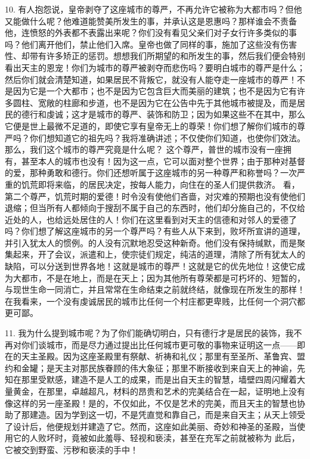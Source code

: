 10. 有人抱怨说，皇帝剥夺了这座城市的尊严，不再允许它被称为大都市吗？但他又能做什么呢？他难道能赞美所发生的事，并承认这是恩惠吗？那样谁会不责备他，连愤怒的外表都不表露出来呢？你们没有看见父亲们对子女行许多类似的事吗？他们离开他们，禁止他们入席。皇帝也做了同样的事，施加了这些没有伤害性、却带有许多矫正的惩罚。想想我们所期望的和所发生的事，然后我们便会特别看出天主的恩宠！你们为城市的尊严被剥夺而悲伤吗？要明白城市的尊严是什么；然后你们就会清楚知道，如果居民不背叛它，就没有人能夺走一座城市的尊严！不是因为它是一个大都市；也不是因为它包含巨大而美丽的建筑；也不是因为它有许多圆柱、宽敞的柱廊和步道，也不是因为它在公告中先于其他城市被提及，而是居民的德行和虔诚；这才是城市的尊严、装饰和防卫；因为如果这些不在其中，那么它便是世上最微不足道的，即使它享有皇帝无上的尊荣！你们想了解你们城市的尊严吗？你们想知道它的祖先吗？我将准确讲述；不仅使你们知道，也使你们效法。那么，我们这个城市的尊严究竟是什么呢？ 这个尊严，普世的城市没有一座拥有，甚至本人的城市也没有！因为这一点，它可以面对整个世界；由于那种对基督的爱，那种勇敢和德行。你们还想听属于这座城市的另一种尊严和称誉吗？一次严重的饥荒即将来临，的居民决定，按每人能力，向住在的圣人们提供救济。 看，第二个尊严，饥荒时期的爱德！时令没有使他们吝啬，对灾难的预期也没有使他们退缩；但当所有人都倾向于搜刮不属于自己的东西时，他们却分施自己的，不仅给近处的人，也给远处居住的人！你们在这里看到对天主的信德和对邻人的爱德了吗？你们想了解这座城市的另一个尊严吗？有些人从下来到，败坏所宣讲的道理，并引入犹太人的惯例。的人没有沉默地忍受这种新奇。他们没有保持缄默，而是聚集起来，开了会议，派遣和上，使宗徒们规定，纯洁的道理，清除了所有犹太人的缺陷，可以分送到世界各地！这就是城市的尊严！这就是它的优先地位！这使它成为大都市，不是在地上，而是在天上；因为其他所有尊荣都是可朽坏的、短暂的，与现世生命一同消亡，并且常常在生命结束之前就终结，就像现在所发生的那样！在我看来，一个没有虔诚居民的城市比任何一个村庄都更卑贱，比任何一个洞穴都更可鄙。\par

11. 我为什么提到城市呢？为了你们能确切明白，只有德行才是居民的装饰，我不再对你们谈城市，而是尽力通过提出比任何城市更可敬的事物来证明这一点——即在的天主圣殿。因为这座圣殿里有祭献、祈祷和礼仪；那里有至圣所、革鲁宾、盟约和金罐；是天主对那民族眷顾的伟大象征；那里不断接收到来自天上的神谕，先知在那里受默感，建造不是人工的成果，而是出自天主的智慧，墙壁四周闪耀着大量黄金，在那里，卓越超凡，材料的昂贵和艺术的完美结合在一起，证明地上没有像这样的另一座圣殿！是的，不仅如此，不仅是艺术的完美，而且天主的智慧也协助了那建造。因为学到这一切，不是凭直觉和靠自己，而是来自天主；从天上领受了设计后，他便规划并建造了它。然而，这座如此美丽、奇妙和神圣的圣殿，当使用它的人败坏时，竟被如此羞辱、轻视和亵渎，甚至在充军之前就被称为 此后，它被交到野蛮、污秽和亵渎的手中！\par

